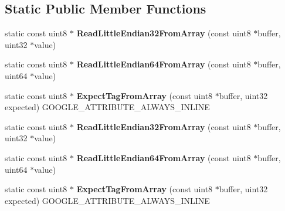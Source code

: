 \subsection*{Static Public Member Functions}
\begin{DoxyCompactItemize}
\item 
\mbox{\label{classgoogle_1_1protobuf_1_1io_1_1CodedInputStream_ae39b5d83a277787796e3151efbd92796}} 
static const uint8 $\ast$ {\bfseries Read\+Little\+Endian32\+From\+Array} (const uint8 $\ast$buffer, uint32 $\ast$value)
\item 
\mbox{\label{classgoogle_1_1protobuf_1_1io_1_1CodedInputStream_ad59934ead5ebcc7701870145eddecc29}} 
static const uint8 $\ast$ {\bfseries Read\+Little\+Endian64\+From\+Array} (const uint8 $\ast$buffer, uint64 $\ast$value)
\item 
\mbox{\label{classgoogle_1_1protobuf_1_1io_1_1CodedInputStream_a364765b0d7418558419d6fb6fb0b4b0b}} 
static const uint8 $\ast$ {\bfseries Expect\+Tag\+From\+Array} (const uint8 $\ast$buffer, uint32 expected) G\+O\+O\+G\+L\+E\+\_\+\+A\+T\+T\+R\+I\+B\+U\+T\+E\+\_\+\+A\+L\+W\+A\+Y\+S\+\_\+\+I\+N\+L\+I\+NE
\item 
\mbox{\label{classgoogle_1_1protobuf_1_1io_1_1CodedInputStream_a36446c10462471a260c99d432ba2c606}} 
static const uint8 $\ast$ {\bfseries Read\+Little\+Endian32\+From\+Array} (const uint8 $\ast$buffer, uint32 $\ast$value)
\item 
\mbox{\label{classgoogle_1_1protobuf_1_1io_1_1CodedInputStream_aee5ebdd63a83161090ad7a46d079ad3d}} 
static const uint8 $\ast$ {\bfseries Read\+Little\+Endian64\+From\+Array} (const uint8 $\ast$buffer, uint64 $\ast$value)
\item 
\mbox{\label{classgoogle_1_1protobuf_1_1io_1_1CodedInputStream_ae96e6a5b70037d7b49100a90a6cf51cd}} 
static const uint8 $\ast$ {\bfseries Expect\+Tag\+From\+Array} (const uint8 $\ast$buffer, uint32 expected) G\+O\+O\+G\+L\+E\+\_\+\+A\+T\+T\+R\+I\+B\+U\+T\+E\+\_\+\+A\+L\+W\+A\+Y\+S\+\_\+\+I\+N\+L\+I\+NE
\end{DoxyCompactItemize}


